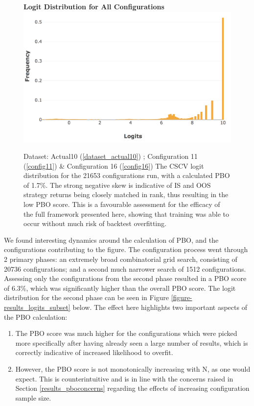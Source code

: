 \documentclass[a4paper,11pt,oneside]{article}
\theoremstyle{plain}
\theoremstyle{definition}
\begin{document}
	\begin{figure}[H]
		\centering 
		\textbf{Logit Distribution for All Configurations}
		\includegraphics[scale=0.4]{images/results/8_9_pbo/all_sets_dist.png} 
		\caption[Logit Distribution for All Configurations]{Dataset: Actual10 (\ref{dataset_actual10}) ; Configuration 11 (\ref{config11}) \&  Configuration 16 (\ref{config16})
			\newline The CSCV logit distribution for the 21653 configurations run, with a calculated PBO of 1.7\%. The strong negative skew is indicative of IS and OOS strategy returns being closely matched in rank, thus resulting in the low PBO score. This is a favourable assessment for the efficacy of the full framework presented here, showing that training was able to occur without much risk of backtest overfitting. }
		\label{figure-results_logits_all}
	\end{figure}
	
	We found interesting dynamics around the calculation of PBO, and the configurations contributing to the figure. The configuration process went through 2 primary phases: an extremely broad combinatorial grid search, consisting of 20736 configurations; and a second much narrower search of 1512 configurations. Assessing only the configurations from the second phase resulted in a PBO score of 6.3\%, which was significantly higher than the overall PBO score. The logit distribution for the second phase can be seen in Figure \ref{figure-results_logits_subset} below. The effect here highlights two important aspects of the PBO calculation:
	\begin{enumerate}
		\item The PBO score was much higher for the configurations which were picked more specifically after having already seen a large number of results, which is correctly indicative of increased likelihood to overfit.
		\item However, the PBO score is not monotonically increasing with N, as one would expect. This is counterintuitive and is in line with the concerns raised in Section \ref{results_pboconcerns} regarding the effects of increasing configuration sample size.
	\end{enumerate}
	
\end{document}
